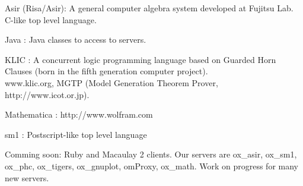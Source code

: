 \documentclass{slides}
\begin{document}

\noindent
{\color{red} Asir} (Risa/Asir):
A general computer algebra system developed at Fujitsu Lab.
C-like top level language.

\noindent
{\color{red} Java} :
Java classes to access to servers.

\noindent
{\color{red} KLIC } :
  A {\color{green} concurrent logic} programming language based
on Guarded Horn Clauses (born in the fifth generation computer project). \\
 {\color{green} www.klic.org}, 
 {\color{red} MGTP} (Model Generation Theorem Prover, http://www.icot.or.jp).

\noindent
{\color{red} Mathematica}  : http://www.wolfram.com

\noindent
{\color{red} sm1} :
Postscript-like top level language

\bigbreak
\noindent
Comming soon: Ruby and Macaulay 2 clients.
Our servers are ox\_asir, ox\_sm1, ox\_phc, ox\_tigers, ox\_gnuplot,
omProxy, ox\_math. Work on progress for many new servers.

\medbreak
\vfill
\noindent
\rightline{\footnotesize {\color{red} {\tt http://www.openxm.org} }}
\end{document}
